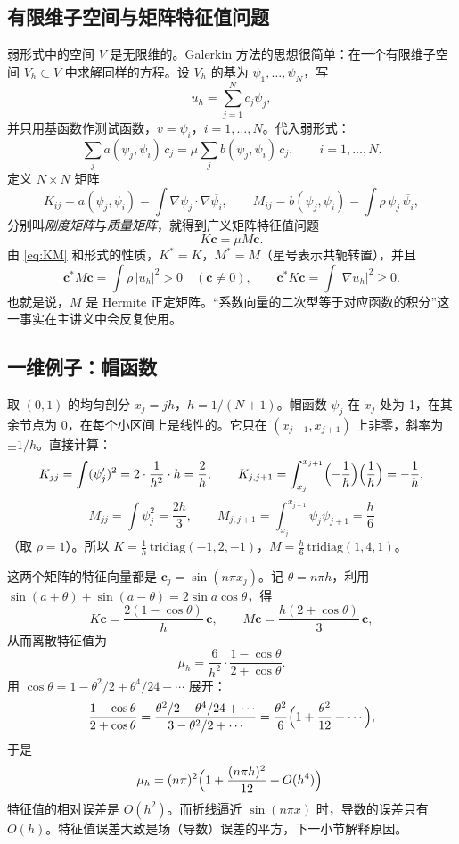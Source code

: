 \documentclass[11pt,a4paper,fontset=fandol]{ctexart}
\begin{document}
\subsection{有限维子空间与矩阵特征值问题}

弱形式中的空间 $V$ 是无限维的。Galerkin 方法的思想很简单：在一个有限维子空间 $V_h\subset V$ 中求解同样的方程。设 $V_h$ 的基为 $\psi_1,\dots,\psi_N$，写
\[
u_h=\sum_{j=1}^N c_j\psi_j ,
\]
并只用基函数作测试函数，$v=\psi_i$，$i=1,\dots,N$。代入弱形式：
\[
\sum_{j}a(\psi_j,\psi_i)\,c_j=\mu\sum_{j}b(\psi_j,\psi_i)\,c_j,\qquad i=1,\dots,N .
\]
定义 $N\times N$ 矩阵
\begin{equation}
\label{eq:KM}
K_{ij}=a(\psi_j,\psi_i)=\int\nabla\psi_j\cdot\nabla\overline{\psi_i},\qquad
M_{ij}=b(\psi_j,\psi_i)=\int\rho\,\psi_j\,\overline{\psi_i},
\end{equation}
分别叫\emph{刚度矩阵}与\emph{质量矩阵}，就得到广义矩阵特征值问题
\begin{equation}
\label{eq:Kc=muMc}
K\bm c=\mu M\bm c .
\end{equation}
由 \eqref{eq:KM} 和形式的性质，$K^*=K$，$M^*=M$（星号表示共轭转置），并且
\[
\bm c^*M\bm c=\int\rho\,|u_h|^2>0\quad(\bm c\ne0),\qquad \bm c^*K\bm c=\int|\nabla u_h|^2\ge0 .
\]
也就是说，$M$ 是 Hermite 正定矩阵。“系数向量的二次型等于对应函数的积分”这一事实在主讲义中会反复使用。

\subsection{一维例子：帽函数}
\label{sec:hat}

取 $(0,1)$ 的均匀剖分 $x_j=jh$，$h=1/(N+1)$。帽函数 $\psi_j$ 在 $x_j$ 处为 1，在其余节点为 0，在每个小区间上是线性的。它只在 $(x_{j-1},x_{j+1})$ 上非零，斜率为 $\pm1/h$。直接计算：
\[
K_{jj}=\int(\psi_j')^2=2\cdot\frac{1}{h^2}\cdot h=\frac2h,\qquad K_{j,j+1}=\int_{x_j}^{x_{j+1}}\Bigl(-\frac1h\Bigr)\Bigl(\frac1h\Bigr)=-\frac1h ,
\]
\[
M_{jj}=\int\psi_j^2=\frac{2h}{3},\qquad M_{j,j+1}=\int_{x_j}^{x_{j+1}}\psi_j\psi_{j+1}=\frac h6
\]
（取 $\rho=1$）。所以 $K=\frac1h\,\mathrm{tridiag}(-1,2,-1)$，$M=\frac h6\,\mathrm{tridiag}(1,4,1)$。

这两个矩阵的特征向量都是 $\bm c_j=\sin(n\pi x_j)$。记 $\theta=n\pi h$，利用 $\sin(a+\theta)+\sin(a-\theta)=2\sin a\cos\theta$，得
\[
K\bm c=\frac{2(1-\cos\theta)}{h}\,\bm c,\qquad M\bm c=\frac{h(2+\cos\theta)}{3}\,\bm c ,
\]
从而离散特征值为
\[
\mu_h=\frac{6}{h^2}\cdot\frac{1-\cos\theta}{2+\cos\theta} .
\]
用 $\cos\theta=1-\theta^2/2+\theta^4/24-\cdots$ 展开：
\[
\frac{1-\cos\theta}{2+\cos\theta}=\frac{\theta^2/2-\theta^4/24+\cdots}{3-\theta^2/2+\cdots}
=\frac{\theta^2}{6}\Bigl(1+\frac{\theta^2}{12}+\cdots\Bigr),
\]
于是
\[
\mu_h=(n\pi)^2\Bigl(1+\frac{(n\pi h)^2}{12}+O(h^4)\Bigr).
\]
特征值的相对误差是 $O(h^2)$。而折线逼近 $\sin(n\pi x)$ 时，导数的误差只有 $O(h)$。特征值误差大致是场（导数）误差的平方，下一小节解释原因。
\end{document}

